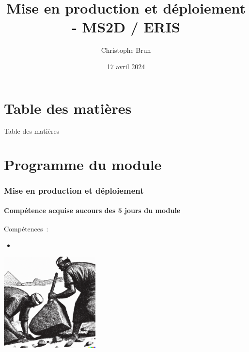 \documentclass{beamer}
\title{Mise en production et déploiement - MS2D / ERIS}
\author{Christophe Brun}
\institute{Campus Saint-Michel IT}
\date{17 avril 2024}
\begin{document}
    \begin{frame}
        \transdissolve
        \titlepage
    \end{frame}


    \section{Table des matières}\label{sec:toc}

    \begin{frame}{Table des matières}
        \tableofcontents
    \end{frame}


    \section{Programme du module}\label{sec:programme-du-module}

    \begin{frame}
        \frametitle{Mise en production et déploiement}
        \framesubtitle{Compétence acquise aucours des 5 jours du module}
        \transdissolve
        Compétences~:
        \begin{itemize}
            \item {}
        \end{itemize}
        \bigbreak
        \centering
        \includegraphics[width=5cm]{image/engraving-of-egyptian-workers-pulling-stones.png}
    \end{frame}
\end{document}
